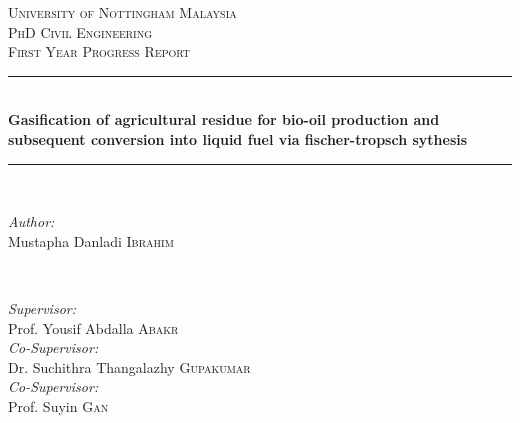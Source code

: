 \begin{titlepage}

\newcommand{\HRule}{\rule{\linewidth}{0.5mm}} %

\center %
 
\textsc{\LARGE University of Nottingham Malaysia}\\[1.5cm] %
\textsc{\Large PhD Civil Engineering}\\[0.5cm] %
\textsc{\large First Year Progress Report}\\[0.5cm] %


\HRule \\[0.4cm]
{ \Large \bfseries Gasification of agricultural residue for bio-oil production and subsequent conversion into liquid fuel via fischer-tropsch sythesis  }\\[0.38cm] %
\HRule \\[1.5cm]

\begin{minipage}{0.4\textwidth}
	\begin{singlespace}
		\begin{flushleft} \large
			\emph{Author:}\\
			Mustapha Danladi \textsc{Ibrahim} %
		\end{flushleft}
	\end{singlespace}

\end{minipage}
~
\begin{minipage}{0.4\textwidth}
	\begin{singlespace}
		\begin{flushright} \large
			\emph{Supervisor:} \\
			Prof. Yousif Abdalla \textsc{Abakr}\\ %
			\bigskip
			\emph{Co-Supervisor:} \\
			Dr. Suchithra Thangalazhy \textsc{Gupakumar}\\
			\bigskip
			\emph{Co-Supervisor:} \\
			Prof. Suyin \textsc{Gan}\\
			\bigskip
		\end{flushright}
	\end{singlespace}
\end{minipage}\\[4cm]




\end{titlepage}
